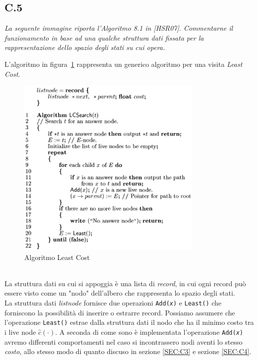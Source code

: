 \documentclass[a4paper]{article}
\begin{document}
\subsection{C.5}
\emph{La seguente immagine riporta l’Algoritmo 8.1 in [HSR07]. Commentarne il funzionamento in base ad una qualche struttura dati fissata per la rappresentazione dello spazio degli stati su cui opera.}


L'algoritmo in figura~\ref{FIG:C5} rappresenta un generico algoritmo per una visita \textit{Least Cost}.\\
\begin{figure}[!ht]
\centering
\includegraphics[width=0.8\textwidth]{./img/C5.png}
\caption{Algoritmo Least Cost} \label{FIG:C5}
\end{figure}\\
La struttura dati su cui si appoggia è una lista di \textit{record}, in cui ogni record può essere visto come un "nodo" dell'albero che rappresenta lo spazio degli stati.\\
La struttura dati \textit{listnode} fornisce due operazioni \texttt{Add(\textit{x})} e \texttt{Least()} che forniscono la possibilità di inserire o estrarre record.
Possiamo assumere che l'operazione \texttt{Least()} estrae dalla struttura dati il nodo che ha il minimo costo tra i live node $ \hat c(\cdot)$.
A seconda di come sono è implementata l'operazione \texttt{Add(\textit{x})} avremo differenti comportamenti nel caso si incontrassero nodi aventi lo stesso \textit{costo}, allo stesso modo di quanto discuso in sezione \ref{SEC:C3} e sezione \ref{SEC:C4}.
\end{document}
